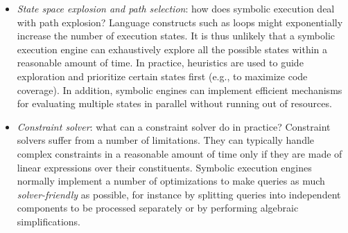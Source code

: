 \begin{itemize}

  \item {\em State space explosion and path selection}: how does symbolic execution deal with path explosion?
Language constructs such as loops might exponentially increase the number of execution states. It is thus unlikely that a symbolic execution engine can exhaustively explore all the possible states within a reasonable amount of time. In practice, heuristics are used to guide exploration and prioritize certain states first (e.g., to maximize code coverage). In addition, symbolic engines can implement efficient mechanisms for evaluating multiple states in parallel without running out of resources.
\vspace{1mm}

  \item {\em Constraint solver}: what can a constraint solver do in practice?
 Constraint solvers suffer from a number of limitations. They can typically handle complex constraints in a reasonable amount of time only if they are made of linear expressions over their constituents. Symbolic execution engines normally implement a number of optimizations to make queries as much {\em solver-friendly} as possible, for instance by splitting queries into independent components to be processed separately or by performing algebraic simplifications.
\vspace{1mm}


\end{itemize}
